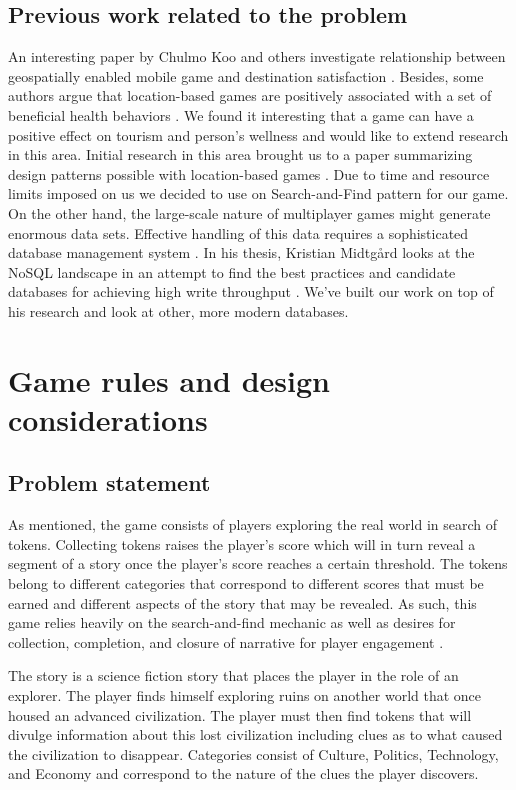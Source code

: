 \documentclass[conference]{IEEEtran}
\begin{document}
\subsection{Previous work related to the problem}
An interesting paper by Chulmo Koo and others investigate relationship between geospatially enabled mobile game and destination satisfaction \cite{destination-engagement}. Besides, some authors argue that location-based games are positively associated with a set of beneficial health behaviors \cite{pokemon-motivation}. We found it interesting that a game can have a positive effect on tourism and person’s wellness and would like to extend research in this area.  
   Initial research in this area brought us to a paper summarizing design patterns possible with location-based games \cite{location-based-mg}. Due to time and resource limits imposed on us we decided to use on Search-and-Find pattern for our game. On the other hand, the large-scale nature of multiplayer games might generate enormous data sets. Effective handling of this data requires a sophisticated database management system \cite{data-store-issues, location-based-services}. In his thesis, Kristian Midtgård looks at the NoSQL landscape in an attempt to find the best practices and candidate databases for achieving high write throughput \cite{massive-amounts-location-data}. We've built our work on top of his research and look at other, more modern databases. 

\section{Game rules and design considerations}
\subsection{Problem statement}
As mentioned, the game consists of players exploring the real world in search of tokens. Collecting tokens raises the player’s score which will in turn reveal a segment of a story once the player’s score reaches a certain threshold. The tokens belong to different categories that correspond to different scores that must be earned and different aspects of the story that may be revealed. As such, this game relies heavily on the search-and-find mechanic as well as desires for collection, completion, and closure of narrative for player engagement \cite{game-methodology, location-based-games}. 

The story is a science fiction story that places the player in the role of an explorer. The player finds himself exploring ruins on another world that once housed an advanced civilization. The player must then find tokens that will divulge information about this lost civilization including clues as to what caused the civilization to disappear. Categories consist of Culture, Politics, Technology, and Economy and correspond to the nature of the clues the player discovers.
\end{document}
